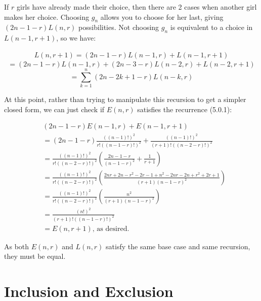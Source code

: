 \documentclass{book}
\numberwithin{equation}{section}
\begin{document}
\begin{enumerate}[label={5.\arabic*}]
If $r$ girls have already made their choice, then there are 2 cases when another girl makes her choice. Choosing
$g_n$ allows you to choose for her last, giving $(2n - 1 - r)L(n, r)$ possibilities. Not choosing $g_n$ is
equivalent to a choice in $L(n-1, r+1)$, so we have:

\begin{align}
L(n, r+1) = (2n-1-r)L(n-1, r) + L(n-1, r+1)
\end{align}
$$=(2n-1-r)L(n-1, r) + (2n-3-r)L(n-2, r) + L(n-2, r+1)$$
$$=\sum_{k=1}^n (2n - 2k + 1 - r)L(n-k, r)$$

At this point, rather than trying to manipulate this recursion to get a simpler closed form, we can just check
if $E(n, r)$ satisfies the recurrence (5.0.1):

\begin{align*}
& (2n-1-r)E(n-1, r) + E(n-1, r+1) \\
& =(2n-1-r)\frac{((n-1)!)^2}{r!((n-1-r)!)^2} + \frac{((n-1)!)^2}{(r+1)!((n-2-r)!)^2} \\
& =\frac{((n-1)!)^2}{r!((n-2-r)!)^2}\left(\frac{2n-1-r}{(n-1-r)^2} + \frac{1}{r+1}\right) \\
& =\frac{((n-1)!)^2}{r!((n-2-r)!)^2}\left(\frac{2nr + 2n - r^2 - 2r - 1 + n^2 - 2nr - 2n + r^2 + 2r + 1}{(r+1)(n-1-r)^2} \right) \\
& =\frac{((n-1)!)^2}{r!((n-2-r)!)^2}\left(\frac{n^2}{(r+1)(n-1-r)^2} \right) \\
& =\frac{(n!)^2}{(r+1)!((n-1-r)!)^2} \\
& =E(n, r+1) \text{, as desired.}
\end{align*}

As both $E(n, r)$ and $L(n, r)$ satisfy the same base case and same recursion, they must be equal.

\end{enumerate}

\chapter{Inclusion and Exclusion}
\end{document}
